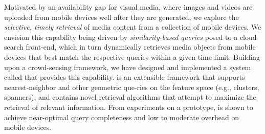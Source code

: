 
%

Motivated by an availability gap for visual media, where images and
videos are uploaded from mobile devices well after they are generated,
we explore the \emph{selective,
  timely retrieval} of media content from a collection of mobile
devices.
%
We envision this capability being driven by \emph{similarity-based
  queries} posed to a cloud search front-end, which in turn
dynamically retrieves media objects from mobile devices that best
match the respective queries within a given time limit.
%
Building upon a crowd-sensing framework, we have designed and
implemented a system called \mscope that provides this capability.
%
\mscope is an extensible framework that supports nearest-neighbor and
other geometric que-ries on the feature space (e.g., clusters,
spanners), and contains novel retrieval algorithms that attempt to
maximize the retrieval of relevant information.
%
From experiments on a prototype, \mscope is shown to achieve
near-optimal query completeness and low to moderate overhead on mobile
devices.


%

